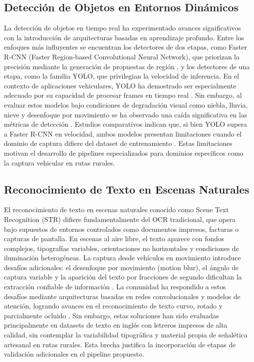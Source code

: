 \documentclass[runningheads]{llncs}
\begin{document}
\subsection{Detección de Objetos en Entornos Dinámicos}

La detección de objetos en tiempo real ha experimentado avances
significativos con la introducción de arquitecturas basadas en aprendizaje profundo. 
Entre los enfoques más influyentes se encuentran los detectores de dos 
etapas, como Faster R-CNN (Faster Region-based Convolutional Neural 
Network), que priorizan la precisión mediante la generación de 
propuestas de región \cite{rnn-faster}, y los detectores de una etapa, 
como la familia YOLO, que privilegian la velocidad de inferencia. En el 
contexto de aplicaciones vehiculares, YOLO ha demostrado ser especialmente
adecuado por su capacidad de procesar frames en tiempo 
real \cite{yolo-vehiculos}. Sin embargo, al evaluar estos modelos bajo 
condiciones de degradación visual como niebla, lluvia, nieve y desenfoque
por movimiento se ha observado una caída significativa en las métricas de detección 
\cite{yolo-escenarios-naturales}. Estudios comparativos indican que, si 
bien YOLO supera a Faster R-CNN en velocidad, ambos modelos presentan 
limitaciones cuando el dominio de captura difiere del dataset de 
entrenamiento \cite{comparacion-yolo-rnn}. Estas limitaciones motivan el
desarrollo de pipelines especializados para dominios específicos como la 
captura vehicular en rutas rurales.

\subsection{Reconocimiento de Texto en Escenas Naturales}
El reconocimiento de texto en escenas naturales conocido como Scene 
Text Recognition (STR) \cite{soni2025performance} difiere 
fundamentalmente del OCR tradicional, que opera bajo supuestos de entornos 
controlados como documentos impresos, facturas o capturas de pantalla. En 
escenas al aire libre, el texto aparece con fondos complejos, tipografías 
variables, orientaciones no horizontales y condiciones de iluminación 
heterogéneas. La captura desde vehículos en movimiento introduce desafíos 
adicionales: el desenfoque por movimiento (motion blur), el ángulo de captura 
variable y la aparición del texto por fracciones de segundo dificultan la 
extracción confiable de información \cite{problemas-ocr-movimiento}. La 
comunidad ha respondido a estos desafíos mediante arquitecturas basadas en 
redes convolucionales y modelos de atención, logrando avances en el 
reconocimiento de texto curvo, rotado y parcialmente ocluido \cite{ocr-curvo}.
Sin embargo, estas soluciones han sido evaluadas principalmente en datasets
 de texto en inglés con letreros impresos de alta calidad, sin contemplar la 
 variabilidad tipográfica y material propia de señalética artesanal en rutas 
 rurales. Esta brecha justifica la incorporación de etapas de validación 
 adicionales en el pipeline propuesto.
\end{document}
